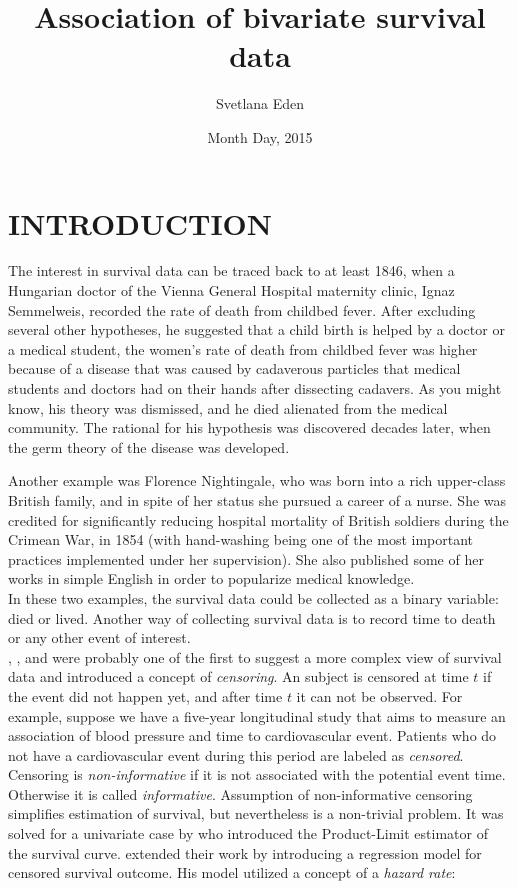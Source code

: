 \documentclass[]{article}
\title{Association of bivariate survival data}
\author{Svetlana Eden}
\date{Month Day, 2015}
\begin{document}
\maketitle
\tableofcontents
\listoffigures
\listoftables
\clearpage

\section{INTRODUCTION}
The interest in survival data can be traced back to at least 1846, when a Hungarian doctor of the Vienna General Hospital maternity clinic, Ignaz Semmelweis, recorded the rate of death from childbed fever. After excluding several other hypotheses, he suggested that a child birth is helped by a doctor or a medical student, the women's rate of death from childbed fever was higher because of a disease that was caused by cadaverous particles that medical students and doctors had on their hands after dissecting cadavers. As you might know, his theory was dismissed, and he died alienated from the medical community. The rational for his hypothesis was discovered decades later, when the germ theory of the disease was developed. 


Another example was Florence Nightingale, who was born into a rich upper-class British family, and in spite of her status she pursued a career of a nurse. She was credited for significantly reducing hospital mortality of British soldiers during the Crimean War, in 1854 (with hand-washing being one of the most important practices implemented under her supervision). She also published some of her works in simple English in order to popularize medical knowledge.\\
In these two examples, the survival data could be collected as a binary variable: died or lived.  Another way of collecting survival data is to record time to death or any other event of interest. \\

\cite{fisher1931truncated},  \cite{hald1949maximum}, and \cite{swan1969computing} were probably one of the first to suggest a more complex view of survival data and introduced a concept of \emph{censoring}. An subject is censored at time $t$ if the event did not happen yet, and after time $t$ it can not be observed. For example, suppose we have a five-year longitudinal study that aims to measure an association of blood pressure and time to cardiovascular event. Patients who do not have a cardiovascular event during this period are labeled as \emph{censored}. Censoring is \emph{non-informative} if it is not associated with the potential event time. Otherwise it is called \emph{informative}. Assumption of non-informative censoring simplifies estimation of survival, but nevertheless is a non-trivial problem. It was solved for a univariate case by \cite{kaplan1958nonparametric} who introduced the Product-Limit estimator of the survival curve. \cite{david1972regression} extended their work by introducing a regression model for censored survival outcome. His model utilized a concept of a \emph{hazard rate}:
\end{document}
